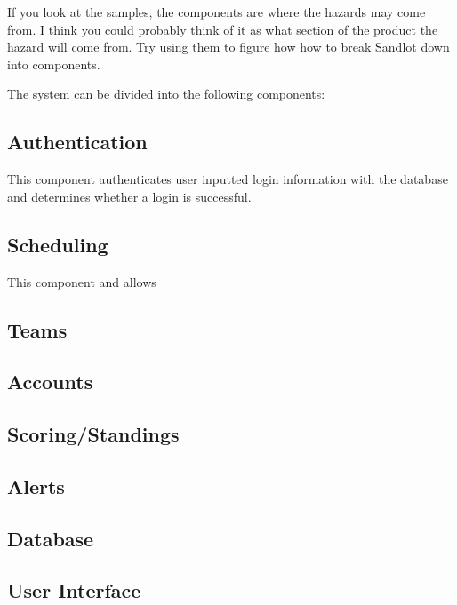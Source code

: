 \documentclass{article}
\begin{document}

If you look at the samples, the components are where the hazards may come from.
I think you could probably think of it as what section of the product the hazard will come from.
Try using them to figure how how to break Sandlot down into components.

The system can be divided into the following components:
\subsection{Authentication}
This component authenticates user inputted login information with the database
and determines whether a login is successful.
\subsection{Scheduling}
This component
and allows 
\subsection{Teams}

\subsection{Accounts}

\subsection{Scoring/Standings}

\subsection{Alerts}

\subsection{Database}

\subsection{User Interface}
\end{document}
